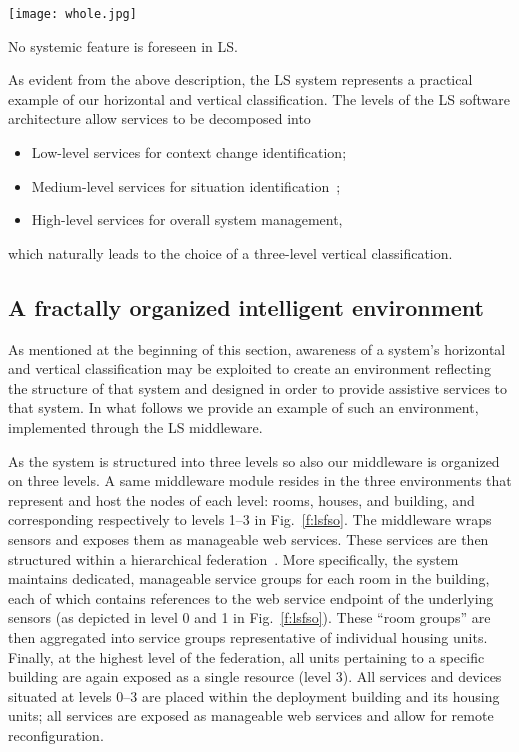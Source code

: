 \documentclass[twocolumn]{svjour3}
\def\K{\hbox{}}
\begin{document}
\begin{figure*}
\centerline{\texttt{[image: whole.jpg]}}
\caption{Exemplification of the LS software architecture.}
\label{f:lsfso}
\end{figure*}

No systemic feature \K{} is foreseen in LS.

As evident from the above description, the LS system represents a practical
example of our horizontal and vertical classification. The levels of the LS
software architecture allow services to be decomposed into
\begin{itemize}
\item Low-level services for context change identification;
\item Medium-level services for situation identification~\cite{YeDM12};
\item High-level services for overall system management,
\end{itemize}
which naturally leads to the choice of a three-level vertical classification.


\subsection{A fractally organized intelligent environment}\label{s:fso:fso}
As mentioned at the beginning of this section, awareness of a system's horizontal and vertical
classification may be exploited to create an environment reflecting the structure of that system
and designed in order to provide assistive services to that system. In what follows we provide
an example of such an environment, implemented through the LS middleware.

As the system is structured into three levels so also our middleware is organized on three levels.
A same middleware module resides 
in the three environments that represent and host the nodes of each level: rooms, houses, and building,
and corresponding respectively to levels 1--3 in Fig.~\ref{f:lsfso}. The middleware
wraps sensors and exposes them as manageable web services. These services are
then structured within a hierarchical federation~\cite{Oasis1}. 
More specifically, the system maintains
dedicated, manageable service groups for each room in the building,
each of which contains references to the web service endpoint of the
underlying sensors (as depicted in level 0 and 1 in Fig.~\ref{f:lsfso}).  These
``room groups'' are then aggregated into service groups
representative of individual housing units. Finally, at the highest
level of the federation, all units pertaining to a specific building
are again exposed as a single resource (level 3).  All services and
devices situated at levels 0--3 are placed within the
deployment building and its housing units; all services are exposed as
manageable web services and allow for remote reconfiguration.
\end{document}
